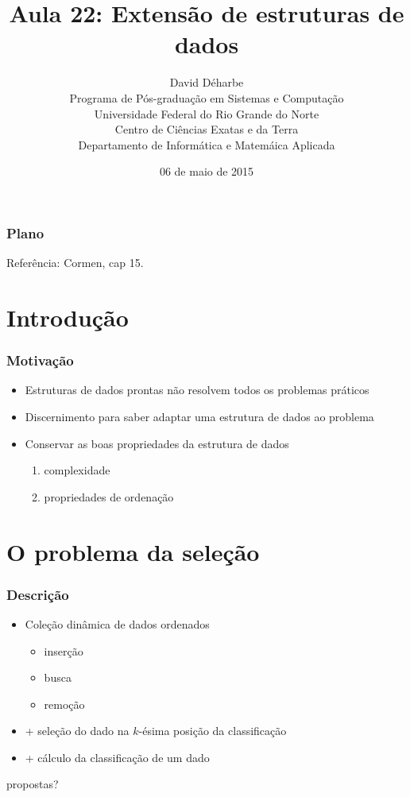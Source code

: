 \documentclass{beamer}
\title{Aula 22: Extensão de estruturas de dados}
\author{David Déharbe \\
  Programa de Pós-graduação em Sistemas e Computação \\
  Universidade Federal do Rio Grande do Norte \\
  Centro de Ciências Exatas e da Terra \\
  Departamento de Informática e Matemáica Aplicada}
\date{06 de maio de 2015}
\begin{document}

\begin{frame}
  \titlepage
\end{frame}

\begin{frame}
  \frametitle{Plano}
  \tableofcontents

Referência: Cormen, cap 15.
\end{frame}

\section{Introdução}

\begin{frame}
\frametitle{Motivação}

\begin{itemize}
\item Estruturas de dados prontas não resolvem todos os problemas práticos
\item Discernimento para saber adaptar uma estrutura de dados ao problema
\item Conservar as boas propriedades da estrutura de dados
\begin{enumerate}
  \item complexidade
  \item propriedades de ordenação
\end{enumerate}
\end{itemize}
\end{frame}

\section{O problema da seleção}

\begin{frame}

\frametitle{Descrição}

\begin{itemize}
\item Coleção dinâmica de dados ordenados
\begin{itemize}
\item inserção
\item busca
\item remoção
\end{itemize}
\item + seleção do dado na $k$-ésima posição da classificação
\item + cálculo da classificação de um dado
\end{itemize}
\pause
\alert{propostas?}

\end{frame}
\end{document}
